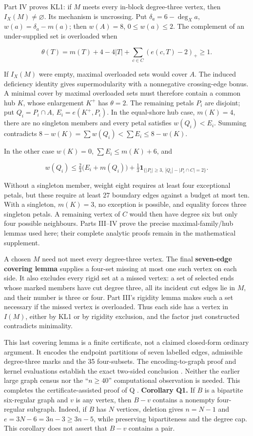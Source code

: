 \documentclass[smallextended]{svjour3}
\newcounter{none} %
\begin{document}
Part IV proves KL1: if \(M\) meets every in-block degree-three vertex,
then \(I_X(M)\ne\varnothing\). Its mechanism is uncrossing. Put
\(\delta_a=6-\deg_X a\), \(w(a)=\delta_a-m(a)\); then \(w(A)=8\),
\(0\le w(a)\le2\). The complement of an under-supplied set is overloaded
when

\[
\theta(T)=m(T)+4-4|T|+\sum_{c\in C}(e(c,T)-2)_+\ge1.
\]

If \(I_X(M)\) were empty, maximal overloaded sets would cover \(A\). The
induced deficiency identity gives supermodularity with a nonnegative
crossing-edge bonus. A minimal cover by maximal overloaded sets must
therefore contain a common hub \(K\), whose enlargement \(K^+\) has
\(\theta=2\). The remaining petals \(P_i\) are disjoint; put
\(Q_i=P_i\cap A\), \(E_i=e(K^+,P_i)\). In the equal-shore hub case,
\(m(K)=4\), there are no singleton members and every petal satisfies
\(w(Q_i)<E_i\). Summing contradicts
\(8-w(K)=\sum w(Q_i)<\sum E_i\le8-w(K)\).

In the other case \(w(K)=0\), \(\sum E_i\le m(K)+6\), and

\[
w(Q_i)\le\tfrac23\bigl(E_i+m(Q_i)\bigr)
+\tfrac13\mathbf1_{\{|P_i|\ge3,\ |Q_i|-|P_i\cap C|=2\}}.
\]

Without a singleton member, weight eight requires at least four
exceptional petals, but these require at least 27 boundary edges against
a budget at most ten. With a singleton, \(m(K)=3\), no exception is
possible, and equality forces three singleton petals. A remaining vertex
of \(C\) would then have degree six but only four possible neighbours.
Parts III--IV prove the precise maximal-family/hub lemmas used here;
their complete analytic proofs remain in the mathematical supplement.

A chosen \(M\) need not meet every degree-three vertex. The final
\textbf{seven-edge covering lemma} supplies a four-set missing at most
one such vertex on each side. It also excludes every rigid set at a
missed vertex: a set of selected ends whose marked members have cut
degree three, all its incident cut edges lie in \(M\), and their number
is three or four. Part III's rigidity lemma makes such a set necessary
if the missed vertex is overloaded. Thus each side has a vertex in
\(I(M)\), either by KL1 or by rigidity exclusion, and the factor just
constructed contradicts minimality.

This last covering lemma is a finite certificate, not a claimed
closed-form ordinary argument. It encodes the endpoint partitions of
seven labelled edges, admissible degree-three marks and the 35
four-subsets. The encoding-to-graph proof and kernel evaluations
establish the exact two-sided conclusion \cite{ref11}. Neither the earlier
large graph census nor the ``\(n\ge40\)'' computational observation is
needed. This completes the certificate-assisted proof of Q \cite{ref11}.
\textbf{Corollary Q1.} If \(B\) is a bipartite six-regular graph and
\(v\) is any vertex, then \(B-v\) contains a nonempty four-regular
subgraph. Indeed, if \(B\) has \(N\) vertices, deletion gives \(n=N-1\)
and \(e=3N-6=3n-3\geq3n-5\), while preserving bipartiteness and the
degree cap. This corollary does not assert that \(B-v\) contains a pair.
\end{document}
